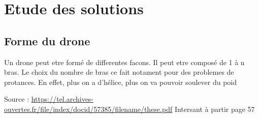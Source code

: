 \documentclass{article}
\begin{document}
\begin{landscape}
\begin{ganttchart}
% 
% 
% 

\end{ganttchart}

\end{landscape}
\section{Etude des solutions}
\subsection{Forme du drone}
Un drone peut etre formé de differentes facons. Il peut etre composé de 1 à n bras. Le choix du nombre de bras ce fait notament pour des problemes de protances. En effet, plus on a d'hélice, plus on va pouvoir soulever du poid 

Source : \url{https://tel.archives-ouvertes.fr/file/index/docid/57385/filename/these.pdf} Intersant à partir page 57
\end{document}
